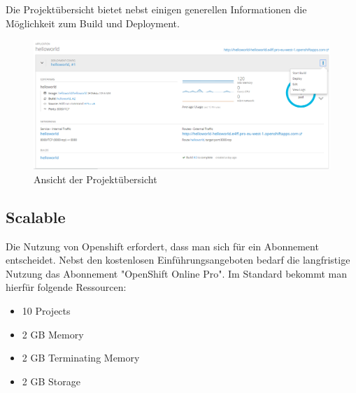 \documentclass[12pt,a4paper]{article}
\begin{document}
\begin{figure}%
    \centering
    \qquad
    \label{fig:os-setup}%
\end{figure}

Die Projektübersicht bietet nebst einigen generellen Informationen die Möglichkeit zum Build und Deployment.

\begin{figure}[h]
	\centering
	\includegraphics[width=0.7\linewidth]{img/os-project-overview}
	\caption{Ansicht der Projektübersicht}
	\label{fig:os-project-overview}
\end{figure}

\subsection{Scalable}

Die Nutzung von Openshift erfordert, dass man sich für ein Abonnement entscheidet. Nebst den kostenlosen Einführungsangeboten bedarf die langfristige Nutzung das Abonnement "OpenShift Online Pro". Im Standard bekommt man hierfür folgende Ressourcen:

\begin{itemize}
	\item 10 Projects
	\item 2 GB Memory
	\item 2 GB Terminating Memory
	\item 2 GB Storage
\end{itemize}
\end{document}
